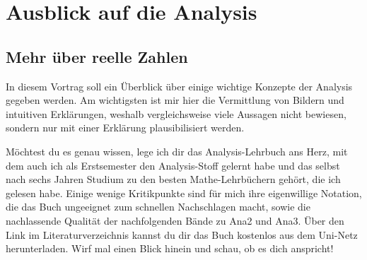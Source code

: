 



\chapter{Ausblick auf die Analysis} \label{kap:analysis}


\section{Mehr über reelle Zahlen}


\begin{bem}[Buchtipp]
    In diesem Vortrag soll ein Überblick über einige wichtige Konzepte der Analysis gegeben werden. Am wichtigsten ist mir hier die Vermittlung von Bildern und intuitiven Erklärungen, weshalb vergleichsweise viele Aussagen nicht bewiesen, sondern nur mit einer Erklärung plausibilisiert werden.
    
    Möchtest du es genau wissen, lege ich dir das Analysis-Lehrbuch \cite{AE06} ans Herz, mit dem auch ich als Erstsemester den Analysis-Stoff gelernt habe und das selbst nach sechs Jahren Studium zu den besten Mathe-Lehrbüchern gehört, die ich gelesen habe. Einige wenige Kritikpunkte sind für mich ihre eigenwillige Notation, die das Buch ungeeignet zum schnellen Nachschlagen macht, sowie die nachlassende Qualität der nachfolgenden Bände zu Ana2 und Ana3. Über den Link im Literaturverzeichnis kannst du dir das Buch kostenlos aus dem Uni-Netz herunterladen. Wirf mal einen Blick hinein und schau, ob es dich anspricht!
\end{bem}


